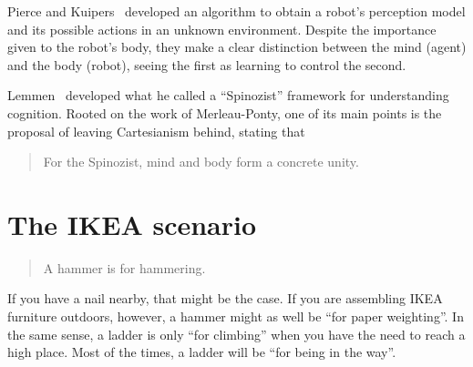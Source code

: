 \documentclass{article}
\begin{document}

Pierce and Kuipers~\cite{pierce1997} developed an algorithm to obtain a robot's
perception model and its possible actions in an unknown environment. Despite the
importance given to the robot's body, they make a clear distinction between the
mind (agent) and the body (robot), seeing the first as learning to control the
second.


Lemmen~\cite{lemmen1997} developed what he called a ``Spinozist'' framework for
understanding cognition. Rooted on the work of Merleau-Ponty, one of its main
points is the proposal of leaving Cartesianism behind, stating that

\begin{quotation}
  For the Spinozist, mind and body form a concrete unity.
\end{quotation}


\section{The IKEA scenario}

\begin{quotation}
  A hammer is for hammering.
\end{quotation}

If you have a nail nearby, that might be the case. If you are assembling IKEA
furniture outdoors, however, a hammer might as well be ``for paper weighting''.
In the same sense, a ladder is only ``for climbing'' when you have the need to
reach a high place. Most of the times, a ladder will be
``for being in the way''.
\end{document}
